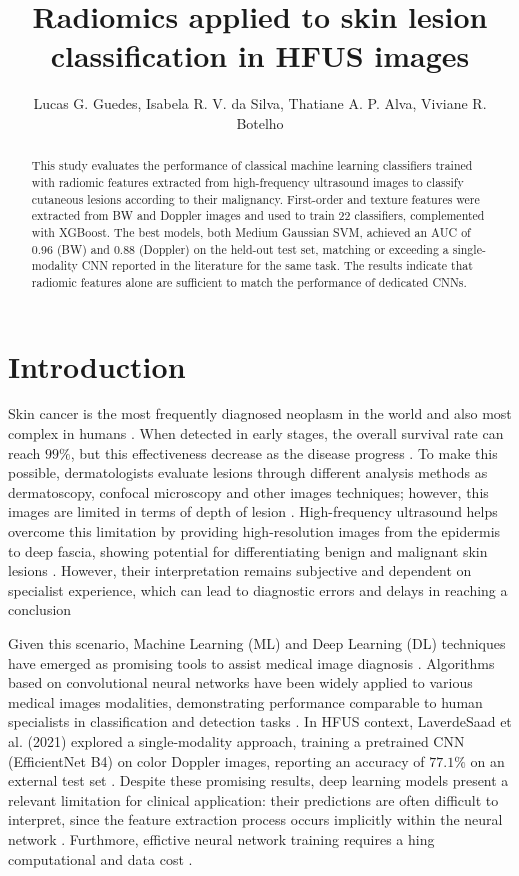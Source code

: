 \documentclass[12pt]{article}
\title{Radiomics applied to skin lesion classification in HFUS images}
\author{Lucas G. Guedes\inst{1}, Isabela R. V. da Silva\inst{2}, Thatiane A. P. Alva\inst{3}, Viviane R. Botelho\inst{4}}
\begin{document}
 

\maketitle

\begin{abstract}
This study evaluates the performance of classical machine learning classifiers trained with radiomic features extracted from high-frequency ultrasound images to classify cutaneous lesions according to their malignancy. First-order and texture features were extracted from BW and Doppler images and used to train 22 classifiers, complemented with XGBoost. The best models, both Medium Gaussian SVM, achieved an AUC of 0.96 (BW) and 0.88 (Doppler) on the held-out test set, matching or exceeding a single-modality CNN reported in the literature for the same task. The results indicate that radiomic features alone are sufficient to match the performance of dedicated CNNs.
\end{abstract}


\section{Introduction}

Skin cancer is the most frequently diagnosed neoplasm in the world and also most complex in humans \cite{Juan2023, Zhu2024}. When detected in early stages, the overall survival rate can reach $99\%$, but this effectiveness decrease as the disease progress \cite{Goyal2020}. To make this possible, dermatologists evaluate lesions through different analysis methods as dermatoscopy, confocal microscopy and other images techniques; however, this images are limited in terms of depth of lesion \cite{Xiao2025, Zhu2024}. High-frequency ultrasound helps overcome this limitation by providing high-resolution images from the epidermis to deep fascia, showing potential for differentiating benign and malignant skin lesions \cite{daSilva2026, Czajkowska2021-1}. However, their interpretation remains subjective and dependent on specialist experience, which can lead to diagnostic errors and delays in
reaching a conclusion \cite{Qin2025}

Given this scenario, Machine Learning (ML) and Deep Learning (DL) techniques have emerged as promising tools to assist medical image diagnosis \cite{daSilva2026}. Algorithms based on convolutional neural networks have been widely applied to various medical images modalities, demonstrating performance comparable to human specialists in classification and detection tasks \cite{LaverdeSaad2021}. In HFUS context, LaverdeSaad et al. (2021) explored a single-modality approach, training a pretrained CNN (EfficientNet B4) on color Doppler images, reporting an accuracy of $77.1\%$ on an external test set \cite{LaverdeSaad2021}. Despite these promising results, deep learning models present a relevant limitation for clinical application: their predictions are often difficult to interpret, since the feature extraction process occurs implicitly within the neural network \cite{Qin2025}. Furthmore, effictive neural network training requires a hing computational and data cost \cite{LaverdeSaad2021}. 
\end{document}
